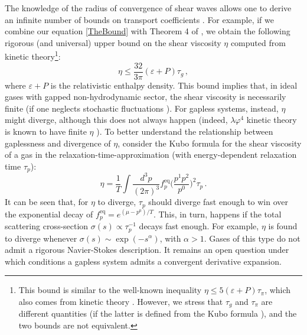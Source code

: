 \documentclass[a4paper, amsfonts, amssymb, amsmath, reprint, showkeys, nofootinbib, twoside, onecolumn,notitlepage]{revtex4-2}
\theoremstyle{definition}
\theoremstyle{theorem}
\theoremstyle{corollary}
\begin{document}
The knowledge of the radius of convergence of shear waves allows one to derive an infinite number of bounds on transport coefficients \cite{HellerHydrohedron2023jtd}. For example, if we combine our equation \eqref{TheBound} with Theorem 4 of \cite{HellerBounds2022ejw}, we obtain the following rigorous (and universal) upper bound on the shear viscosity $\eta$ computed from kinetic theory\footnote{This bound is similar to the well-known inequality $\eta \leq 5(\varepsilon{+}P)\tau_\pi$, which also comes from kinetic theory \cite{Ghiglieri:2018dgf}. However, we stress that $\tau_g$ and $\tau_\pi$ are different quantities (if the latter is defined from the Kubo formula \cite{Denicol_Relaxation_2011,WagnerGavassino2023jgq}), and the two bounds are not equivalent.}:
\begin{equation}
\eta \leq \dfrac{32}{3\pi} (\varepsilon{+}P) \tau_g \, ,
\end{equation}
where $\varepsilon{+}P$ is the relativistic enthalpy density. This bound implies that, in ideal gases with gapped non-hydrodynamic sector, the shear viscosity is necessarily finite (if one neglects stochastic fluctuations \cite{KovtunStickiness2011}). For gapless systems, instead, $\eta$ might diverge, although this does not always happen (indeed, $\lambda \varphi^4$ kinetic theory is known to have finite $\eta$ \cite{Rocha:2023hts}). To better understand the relationship between gaplessness and divergence of $\eta$, consider the Kubo formula for the shear viscosity of a gas \cite{Denicol_Relaxation_2011} in the relaxation-time-approximation (with energy-dependent relaxation time $\tau_p$):
\begin{equation}
\eta= \dfrac{1}{T} \int \dfrac{d^3p}{(2\pi)^3} f^{\text{eq}}_p \bigg( \dfrac{p^1 p^2}{p^0}\bigg)^2 \tau_p \, .
\end{equation}
It can be seen that, for $\eta$ to diverge, $\tau_p$ should diverge fast enough to win over the exponential decay of $f^{\text{eq}}_p=e^{(\mu-p^0)/T}$. This, in turn, happens if the total scattering cross-section $\sigma(s) \propto \tau^{-1}_p$ decays fast enough. For example, $\eta$ is found to diverge whenever $\sigma(s) \sim \exp(-s^\alpha)$, with $\alpha>1$. Gases of this type do not admit a rigorous Navier-Stokes description. It remains an open question under which conditions a gapless system admits a convergent derivative expansion.
\end{document}
